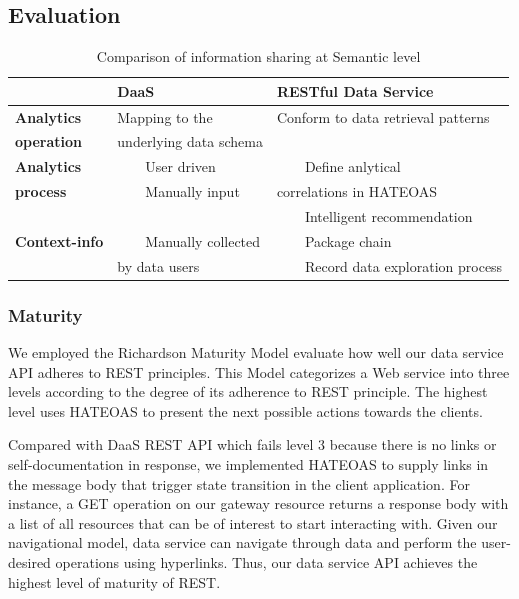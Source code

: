 \documentclass[10pt, conference, compsocconf]{IEEEtran}
\begin{document}
\subsection{Evaluation}
\newcommand{\tabitem}{~~\llap{\textbullet}~~}
\begin{table}[ht!]
	\caption{Comparison of information sharing at Semantic level}
	\label{table.1}
	\scriptsize
	\centering
	\begin{tabular}{lll}
		\toprule
		&\quad\quad\quad \textbf{DaaS} & \quad\quad\textbf{RESTful Data Service}  \\ 		
		\midrule
		\textbf{Analytics} & Mapping to the & Conform to data retrieval patterns \\ 
		\textbf{operation} & underlying data schema &  \\ 
		\midrule
		\textbf{Analytics} & \tabitem User driven & \tabitem Define anlytical  \\
		\textbf{process} & \tabitem Manually input &  correlations in HATEOAS\\
	    &  & \tabitem Intelligent recommendation\\
		\midrule
	    \textbf{Context-info} & \tabitem Manually collected & \tabitem Package chain \\
	     & by data users & \tabitem Record data exploration process \\
		\bottomrule
	\end{tabular}
\end{table}


\subsubsection{Maturity}We employed the Richardson Maturity Model\cite{RichardMo} evaluate how well our data service API adheres to REST principles. This Model categorizes a Web service into three levels according to the degree of its adherence to REST principle. The highest level uses HATEOAS to present the next possible actions towards the clients. 

Compared with DaaS REST API which fails level 3 because there is no links or self-documentation in response, we implemented HATEOAS to supply links in the message body that trigger state transition in the client application. For instance, a GET operation on our gateway resource returns a response body with a list of all resources that can be of interest to start interacting with. Given our navigational model, data service can navigate through data and perform the user-desired operations using hyperlinks. Thus, our data service API achieves the highest level of maturity of REST.
\end{document}
